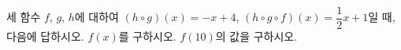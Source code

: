 \hspace*{2mm}\begin{minipage}[t]{\dimexpr\linewidth-2mm\relax}\vspace{0pt}
세 함수 $f$, $g$, $h$에 대하여 $(h\circ g)(x)=-x+4$, $(h\circ g\circ f)(x)=\dfrac{1}{2}x+1$일 때, 다음에 답하시오.
 $f(x)$를 구하시오.
 $f(10)$의 값을 구하시오.\end{minipage}
